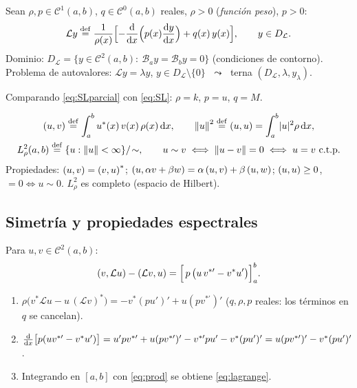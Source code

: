 \documentclass[11pt,a4paper,twoside]{article}
\newcommand{\Lop}{\mathcal{L}}
\begin{document}
\begin{definicion}
Sean $\rho,p\in\mathcal C^1(a,b)$, $q\in\mathcal C^0(a,b)$ reales, $\rho>0$ (\emph{función peso}), $p>0$:
\begin{equation}\label{eq:SL}
\Lop y\defeq\frac{1}{\rho(x)}\Bigl[-\dv{}{x}\Bigl(p(x)\dv{y}{x}\Bigr)+q(x)\,y(x)\Bigr],
\qquad y\in D_{\Lop}.
\end{equation}
Dominio: $D_{\Lop}=\{y\in\mathcal C^2(a,b):\ \mathcal B_a y=\mathcal B_b y=0\}$ (condiciones de contorno).
Problema de autovalores: $\Lop y=\lambda y$, $y\in D_{\Lop}\setminus\{0\}$ $\;\leadsto\;$ terna $(D_{\Lop},\lambda,y_\lambda)$.
\end{definicion}

Comparando \eqref{eq:SLparcial} con \eqref{eq:SL}: $\rho=k$, $p=u$, $q=M$.

\begin{definicion}
\begin{gather}
\left(u,v\right)\stackrel{\mathrm{def}}{=}\int_a^b u^*(x)\,v(x)\,\rho(x)\,\mathrm{d} x,\qquad
\left\lVert u\right\rVert^2\stackrel{\mathrm{def}}{=}\left(u,u\right)=\int_a^b\lvert u\rvert^2\rho\,\mathrm{d} x,\label{eq:prod}\\
L^2_\rho(a,b)\stackrel{\mathrm{def}}{=}\{u:\left\lVert u\right\rVert<\infty\}/\!\sim,\qquad
u\sim v\iff\left\lVert u-v\right\rVert=0\iff u=v\ \text{c.t.p.}\notag
\end{gather}
Propiedades: $\left(u,v\right)=\left(v,u\right)^*$; $\left(u,\alpha v+\beta w\right)=\alpha\left(u,v\right)+\beta\left(u,w\right)$;
$\left(u,u\right)\ge0$, $=0\iff u\sim0$. $L^2_\rho$ es completo (espacio de Hilbert).
\end{definicion}

\subsection{Simetría y propiedades espectrales}

\begin{proposicion}
Para $u,v\in\mathcal C^2(a,b)$:
\begin{equation}\label{eq:lagrange}
\ip{v}{\Lop u}-\ip{\Lop v}{u}=\Bigl[\,p\,\bigl(u\,v^{*\prime}-v^{*}u'\bigr)\Bigr]_a^b .
\end{equation}
\end{proposicion}

\begin{demostracion}
\begin{enumerate}
\item $\rho\bigl(v^*\Lop u-u\,(\Lop v)^*\bigr)=-v^*(pu')'+u(pv^{*\prime})'$ \quad($q,\rho,p$ reales: los términos en $q$ se cancelan).
\item $\frac{\mathrm{d} }{\mathrm{d} x}\bigl[p(u v^{*\prime}-v^*u')\bigr]=u'pv^{*\prime}+u(pv^{*\prime})'-v^{*\prime}pu'-v^*(pu')'=u(pv^{*\prime})'-v^*(pu')'$.
\item Integrando en $[a,b]$ con \eqref{eq:prod} se obtiene \eqref{eq:lagrange}.
\end{enumerate}
\end{demostracion}
\end{document}
